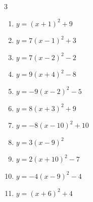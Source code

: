 \begin{multicols}{3}
\begin{enumerate}
        \phantom{$\displaystyle 頂点\left( 10 , -5 \right)$}

  \item $\displaystyle y=\left( x+1\right)^{2}+9$

        \phantom{$\displaystyle 頂点\left( -1 , 9 \right)$}

  \item $\displaystyle y=7\left( x-1\right)^{2}+3$

        \phantom{$\displaystyle 頂点\left( 1 , 3 \right)$}

  \item $\displaystyle y=7\left( x-2\right)^{2}-2$

        \phantom{$\displaystyle 頂点\left( 2 , -2 \right)$}

  \item $\displaystyle y=9\left( x+4\right)^{2}-8$

        \phantom{$\displaystyle 頂点\left( -4 , -8 \right)$}

  \item $\displaystyle y=-9\left( x-2\right)^{2}-5$

        \phantom{$\displaystyle 頂点\left( 2 , -5 \right)$}

  \item $\displaystyle y=8\left( x+3\right)^{2}+9$

        \phantom{$\displaystyle 頂点\left( -3 , 9 \right)$}

  \item $\displaystyle y=-8\left( x-10\right)^{2}+10$

        \phantom{$\displaystyle 頂点\left( 10 , 10 \right)$}

  \item $\displaystyle y=3\left( x-9\right)^{2}$

        \phantom{$\displaystyle 頂点\left( 9 , 0 \right)$}

  \item $\displaystyle y=2\left( x+10\right)^{2}-7$

        \phantom{$\displaystyle 頂点\left( -10 , -7 \right)$}

  \item $\displaystyle y=-4\left( x-9\right)^{2}-4$

        \phantom{$\displaystyle 頂点\left( 9 , -4 \right)$}

  \item $\displaystyle y=\left( x+6\right)^{2}+4$

        \phantom{$\displaystyle 頂点\left( -6 , 4 \right)$}


\end{enumerate}
\end{multicols}

